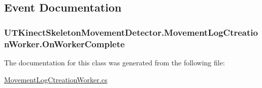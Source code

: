 \subsection{Event Documentation}
\hypertarget{classUTKinectSkeletonMovementDetector_1_1MovementLogCtreationWorker_a9602a7bd07fa4db7c977303e6b25e4ec}{
\subsubsection[{On\-Worker\-Complete}]{ U\-T\-Kinect\-Skeleton\-Movement\-Detector.\-Movement\-Log\-Ctreation\-Worker.\-On\-Worker\-Complete}}\label{classUTKinectSkeletonMovementDetector_1_1MovementLogCtreationWorker_a9602a7bd07fa4db7c977303e6b25e4ec}


The documentation for this class was generated from the following file\-:\begin{DoxyCompactItemize}
\item 
\hyperlink{MovementLogCtreationWorker_8cs}{Movement\-Log\-Ctreation\-Worker.\-cs}\end{DoxyCompactItemize}
